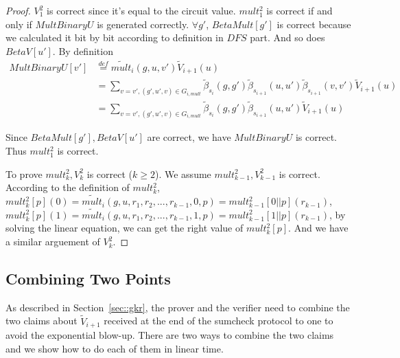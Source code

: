 {\begin{proof}
$V_1^2$ is correct since it's equal to the circuit value. $mult_1^2$ is correct if and only if $MultBinaryU$ is generated correctly. $\forall g'$, $BetaMult[g']$ is correct because we calculated it bit by bit according to definition in $DFS$ part. And so does $BetaV[u']$. By definition 
\begin{align*}
MultBinaryU[v']&\overset{def}{=}\tilde{mult}_{i}(g, u, v')\tilde{V}_{i+1}(u)
\\&=\sum_{v=v', (g', u', v) \in G_{i, mult}}\tilde{\beta}_{s_{i}}(g, g')\tilde{\beta}_{s_{i+1}}(u, u')\tilde{\beta}_{s_{i+1}}(v, v')\tilde{V}_{i+1}(u)
\\&=\sum_{v=v', (g', u', v) \in G_{i, mult}}\tilde{\beta}_{s_{i}}(g, g')\tilde{\beta}_{s_{i+1}}(u, u')\tilde{V}_{i+1}(u)
\end{align*}

Since $BetaMult[g'], BetaV[u']$ are correct, we have $MultBinaryU$ is correct. Thus $mult_1^2$ is correct.

To prove $mult_k^2, V_k^2$ is correct ($k \ge 2$). We assume $mult_{k-1}^2, V_{k-1}^2$ is correct. According to the definition of $mult_k^2$, $mult_k^2[p](0)=\tilde{mult}_i(g, u, {r_1, r_2,...,r_{k-1}, 0, p})=mult_{k-1}^2[0||p](r_{k-1})$, $mult_k^2[p](1)=\tilde{mult}_i(g, u, {r_1, r_2,...,r_{k-1}, 1, p})=mult_{k-1}^2[1||p](r_{k-1})$, by solving the linear equation, we can get the right value of $mult_k^2[p]$. And we have a similar arguement of $V_k^2$.
\end{proof}
}

\subsection{Combining Two Points}

As described in Section~\ref{sec::gkr}, the prover and the verifier need to combine the two claims about $\tilde{V}_{i+1}$ received at the end of the sumcheck protocol to one to avoid the exponential blow-up. There are two ways to combine the two claims and we show how to do each of them in linear time. 

